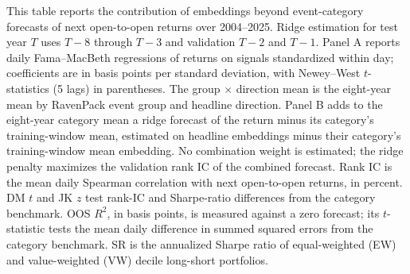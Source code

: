 \begin{table}[htbp]
\centering
\caption{Return Forecasts Combining Categories and Embeddings}
\label{tab:tab2}
\begin{minipage}{\linewidth}\footnotesize
This table reports the contribution of embeddings beyond event-category forecasts of next open-to-open returns over 2004--2025. Ridge estimation for test year $T$ uses $T-8$ through $T-3$ and validation $T-2$ and $T-1$. Panel A reports daily Fama--MacBeth regressions of returns on signals standardized within day; coefficients are in basis points per standard deviation, with Newey--West $t$-statistics (5 lags) in parentheses. The group $\times$ direction mean is the eight-year mean by RavenPack event group and headline direction. Panel B adds to the eight-year category mean a ridge forecast of the return minus its category's training-window mean, estimated on headline embeddings minus their category's training-window mean embedding. No combination weight is estimated; the ridge penalty maximizes the validation rank IC of the combined forecast. Rank IC is the mean daily Spearman correlation with next open-to-open returns, in percent. DM $t$ and JK $z$ test rank-IC and Sharpe-ratio differences from the category benchmark. OOS $R^2$, in basis points, is measured against a zero forecast; its $t$-statistic tests the mean daily difference in summed squared errors from the category benchmark. SR is the annualized Sharpe ratio of equal-weighted (EW) and value-weighted (VW) decile long-short portfolios.
\end{minipage}
\medskip


\end{table}

